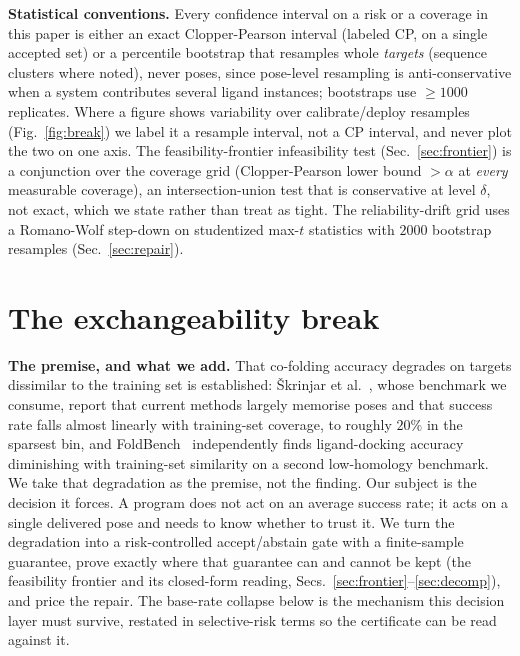 \documentclass[10pt]{article}
\begin{document}
\textbf{Statistical conventions.} Every confidence interval on a risk or a coverage in this paper is either
an exact Clopper-Pearson interval (labeled CP, on a single accepted set) or a percentile bootstrap that
resamples whole \emph{targets} (sequence clusters where noted), never poses, since pose-level resampling is
anti-conservative when a system contributes several ligand instances; bootstraps use $\ge1000$ replicates.
Where a figure shows variability over calibrate/deploy resamples (Fig.~\ref{fig:break}) we label it a
resample interval, not a CP interval, and never plot the two on one axis. The feasibility-frontier
infeasibility test (Sec.~\ref{sec:frontier}) is a conjunction over the coverage grid (Clopper-Pearson lower
bound $>\alpha$ at \emph{every} measurable coverage), an intersection-union test that is conservative at
level $\delta$, not exact, which we state rather than treat as tight. The reliability-drift grid uses a
Romano-Wolf step-down on studentized max-$t$ statistics with $2000$ bootstrap resamples
(Sec.~\ref{sec:repair}).

\section{The exchangeability break}\label{sec:break}
\textbf{The premise, and what we add.} That co-folding accuracy degrades on targets dissimilar to the
training set is established: \v{S}krinjar et al.~\citep{rnp}, whose benchmark we consume, report that current
methods largely memorise poses and that success rate falls almost linearly with training-set coverage, to
roughly $20\%$ in the sparsest bin, and FoldBench~\citep{foldbench} independently finds ligand-docking
accuracy diminishing with training-set similarity on a second low-homology benchmark. We take that
degradation as the premise, not the finding. Our subject
is the decision it forces. A program does not act on an average success rate; it acts on a single delivered
pose and needs to know whether to trust it. We turn the degradation into a risk-controlled accept/abstain
gate with a finite-sample guarantee, prove exactly where that guarantee can and cannot be kept (the
feasibility frontier and its closed-form reading, Secs.~\ref{sec:frontier}--\ref{sec:decomp}), and price the
repair. The base-rate collapse below is the mechanism this decision layer must survive, restated in
selective-risk terms so the certificate can be read against it.
\end{document}
